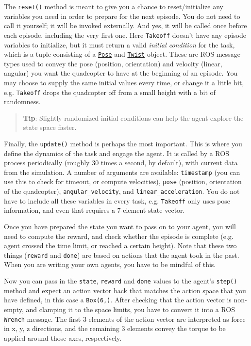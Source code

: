 \documentclass[11pt]{article}
\begin{document}
The \texttt{reset()} method is meant to give you a chance to
reset/initialize any variables you need in order to prepare for the next
episode. You do not need to call it yourself; it will be invoked
externally. And yes, it will be called once before each episode,
including the very first one. Here \texttt{Takeoff} doesn't have any
episode variables to initialize, but it must return a valid
\emph{initial condition} for the task, which is a tuple consisting of a
\href{http://docs.ros.org/api/geometry_msgs/html/msg/Pose.html}{\texttt{Pose}}
and
\href{http://docs.ros.org/api/geometry_msgs/html/msg/Twist.html}{\texttt{Twist}}
object. These are ROS message types used to convey the pose (position,
orientation) and velocity (linear, angular) you want the quadcopter to
have at the beginning of an episode. You may choose to supply the same
initial values every time, or change it a little bit, e.g.
\texttt{Takeoff} drops the quadcopter off from a small height with a bit
of randomness.

\begin{quote}
\textbf{Tip}: Slightly randomized initial conditions can help the agent
explore the state space faster.
\end{quote}

Finally, the \texttt{update()} method is perhaps the most important.
This is where you define the dynamics of the task and engage the agent.
It is called by a ROS process periodically (roughly 30 times a second,
by default), with current data from the simulation. A number of
arguments are available: \texttt{timestamp} (you can use this to check
for timeout, or compute velocities), \texttt{pose} (position,
orientation of the quadcopter), \texttt{angular\_velocity}, and
\texttt{linear\_acceleration}. You do not have to include all these
variables in every task, e.g. \texttt{Takeoff} only uses pose
information, and even that requires a 7-element state vector.

Once you have prepared the state you want to pass on to your agent, you
will need to compute the reward, and check whether the episode is
complete (e.g. agent crossed the time limit, or reached a certain
height). Note that these two things (\texttt{reward} and \texttt{done})
are based on actions that the agent took in the past. When you are
writing your own agents, you have to be mindful of this.

Now you can pass in the \texttt{state}, \texttt{reward} and
\texttt{done} values to the agent's \texttt{step()} method and expect an
action vector back that matches the action space that you have defined,
in this case a \texttt{Box(6,)}. After checking that the action vector
is non-empty, and clamping it to the space limits, you have to convert
it into a ROS \texttt{Wrench} message. The first 3 elements of the
action vector are interpreted as force in x, y, z directions, and the
remaining 3 elements convey the torque to be applied around those axes,
respectively.
\end{document}
